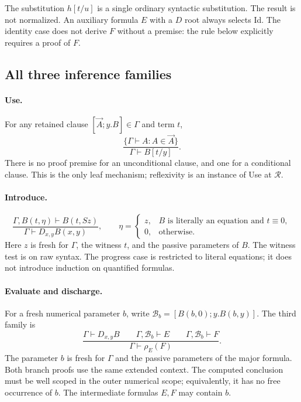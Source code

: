 The substitution $h[t/u]$ is a single ordinary syntactic substitution.
The result is not normalized. An auxiliary formula $E$ with a $D$ root
always selects Id. The identity case does not derive $F$ without a premise:
the rule below explicitly requires a proof of $F$.

\subsection{All three inference families}

\paragraph{Use.}
For any retained clause $[\vec A;y.B]\in\Gamma$ and term $t$,
\[
 \frac{\{\Gamma\vdash A:A\in\vec A\}}
      {\Gamma\vdash B[t/y]}.
 \tag{Use}\label{eq:raw-use}
\]
There is no proof premise for an unconditional clause, and one for a
conditional clause. This is the only leaf mechanism; reflexivity is an
instance of Use at $\mathcal R$.

\paragraph{Introduce.}
\[
 \frac{\Gamma,B(t,\eta)\vdash B(t,Sz)}
      {\Gamma\vdash D_{x,y}B(x,y)},\qquad
 \eta=\begin{cases}
 z,&B\text{ is literally an equation and }t\equiv0,\\
 0,&\text{otherwise}.
 \end{cases}
 \tag{Intro}\label{eq:raw-intro}
\]
Here $z$ is fresh for $\Gamma$, the witness $t$, and the passive parameters
of $B$. The witness test is on raw syntax. The progress case is restricted
to literal equations; it does not introduce induction on quantified formulas.

\paragraph{Evaluate and discharge.}
For a fresh numerical parameter $b$, write
$\mathcal B_b=[B(b,0);y.B(b,y)]$. The third family is
\[
 \frac{\Gamma\vdash D_{x,y}B\qquad
       \Gamma,\mathcal B_b\vdash E\qquad
       \Gamma,\mathcal B_b\vdash F}
      {\Gamma\vdash\rho_E(F)}.
 \tag{Discharge}\label{eq:raw-discharge}
\]
The parameter $b$ is fresh for $\Gamma$ and the passive parameters of the
major formula. Both branch proofs use the same extended context. The
computed conclusion must be well scoped in the outer numerical scope;
equivalently, it has no free occurrence of $b$. The intermediate formulas
$E,F$ may contain $b$.


